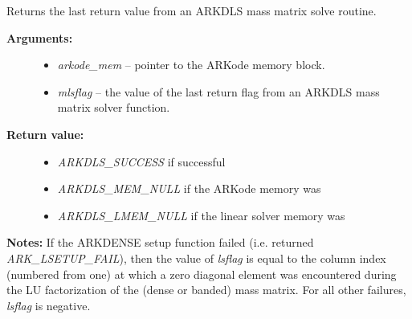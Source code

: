 \documentclass[letterpaper,10pt,english]{sphinxmanual}
\begin{document}
\begin{fulllineitems}
\label{c_interface/User_callable:c.ARKDlsGetLastMassFlag}
Returns the last return value from an ARKDLS mass matrix solve routine.
\begin{description}
\item[{\textbf{Arguments:}}] \leavevmode\begin{itemize}
\item {} 
\emph{arkode\_mem} -- pointer to the ARKode memory block.

\item {} 
\emph{mlsflag} -- the value of the last return flag from an ARKDLS
mass matrix solver function.

\end{itemize}

\item[{\textbf{Return value:}}] \leavevmode\begin{itemize}
\item {} 
\emph{ARKDLS\_SUCCESS} if successful

\item {} 
\emph{ARKDLS\_MEM\_NULL} if the ARKode memory was 

\item {} 
\emph{ARKDLS\_LMEM\_NULL} if the linear solver memory was 

\end{itemize}

\end{description}

\textbf{Notes:} If the ARKDENSE setup function failed
(i.e. {\hyperref[c_interface/User_callable:c.ARKode]{\emph{}}} returned \emph{ARK\_LSETUP\_FAIL}), then the
value of \emph{lsflag} is equal to the column index (numbered from
one) at which a zero diagonal element was encountered during the LU
factorization of the (dense or banded) mass matrix.  For all
other failures, \emph{lsflag} is negative.

\end{fulllineitems}

\end{document}

